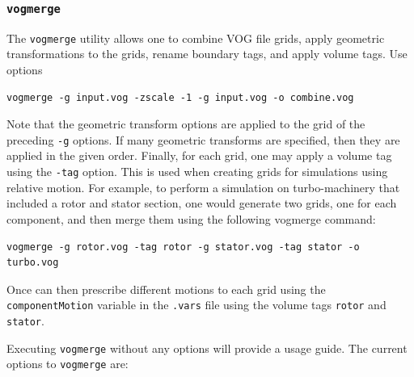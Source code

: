 \documentclass{article}
\begin{document}
\subsubsection{\tt vogmerge}

The {\tt vogmerge} utility allows one to combine VOG file grids, apply
geometric transformations to the grids, rename boundary tags, and
apply volume tags.  Use options 

\begin{verbatim}
vogmerge -g input.vog -zscale -1 -g input.vog -o combine.vog
\end{verbatim}

Note that the geometric transform options are applied to the grid of
the preceding {\tt -g} options.  If many geometric transforms are
specified, then they are applied in the given order.  Finally, for
each grid, one may apply a volume tag using the {\tt -tag} option.
This is used when creating grids for simulations using relative
motion.  For example, to perform a simulation on turbo-machinery that
included a rotor and stator section, one would generate two grids, one
for each component, and then merge them using the following vogmerge
command:
\begin{verbatim}
vogmerge -g rotor.vog -tag rotor -g stator.vog -tag stator -o turbo.vog
\end{verbatim}
Once can then prescribe different motions to each grid using the {\tt
  componentMotion} variable in the {\tt .vars} file using the volume tags
{\tt rotor} and {\tt stator}.

Executing {\tt vogmerge} without any options will provide a usage guide.
The current options to {\tt vogmerge} are:
\end{document}
